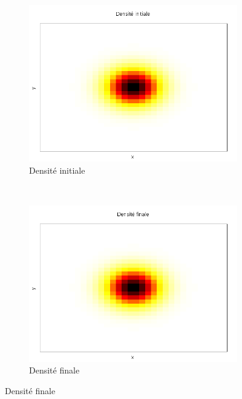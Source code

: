 \documentclass[a4paper,12pt]{article}
\begin{document}
\begin{figure}[!h]
\centering
\begin{subfigure}[b]{0.45\linewidth}
\includegraphics[width=\linewidth]{img/2DObstacle/f0.png}
\caption{Densité initiale}
\end{subfigure}
~
\begin{subfigure}[b]{0.45\linewidth}
\includegraphics[width=\linewidth]{img/2DObstacle/f1.png}
\caption{Densité finale}
\end{subfigure}


\end{figure}
\end{document}
